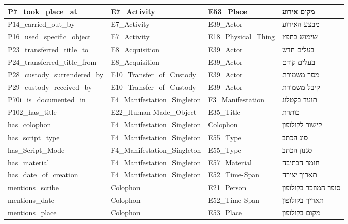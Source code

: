 \documentclass[12pt,a4paper]{article}
\begin{document}
{\begin{longtable}{|p{4cm}|p{3.5cm}|p{3.5cm}|p{4.5cm}|}
\hline
\textenglish{P7\_took\_place\_at} & \textenglish{E7\_Activity} & \textenglish{E53\_Place} & מקום אירוע \\
\hline
\textenglish{P14\_carried\_out\_by} & \textenglish{E7\_Activity} & \textenglish{E39\_Actor} & מבצע האירוע \\
\hline
\textenglish{P16\_used\_specific\_object} & \textenglish{E7\_Activity} & \textenglish{E18\_Physical\_Thing} & שימוש בחפץ \\
\hline
\textenglish{P23\_transferred\_title\_to} & \textenglish{E8\_Acquisition} & \textenglish{E39\_Actor} & בעלים חדש \\
\hline
\textenglish{P24\_transferred\_title\_from} & \textenglish{E8\_Acquisition} & \textenglish{E39\_Actor} & בעלים קודם \\
\hline
\textenglish{P28\_custody\_surrendered\_by} & \textenglish{E10\_Transfer\_of\_Custody} & \textenglish{E39\_Actor} & מסר משמורת \\
\hline
\textenglish{P29\_custody\_received\_by} & \textenglish{E10\_Transfer\_of\_Custody} & \textenglish{E39\_Actor} & קיבל משמורת \\
\hline
\textenglish{P70i\_is\_documented\_in} & \textenglish{F4\_Manifestation\_Singleton} & \textenglish{F3\_Manifestation} & תועד בקטלוג \\
\hline
\textenglish{P102\_has\_title} & \textenglish{E22\_Human-Made\_Object} & \textenglish{E35\_Title} & כותרת \\
\hline
\textenglish{has\_colophon} & \textenglish{F4\_Manifestation\_Singleton} & \textenglish{Colophon} & קישור לקולופון \\
\hline
\textenglish{has\_script\_type} & \textenglish{F4\_Manifestation\_Singleton} & \textenglish{E55\_Type} & סוג הכתב \\
\hline
\textenglish{has\_Script\_Mode} & \textenglish{F4\_Manifestation\_Singleton} & \textenglish{E55\_Type} & סגנון הכתב \\
\hline
\textenglish{has\_material} & \textenglish{F4\_Manifestation\_Singleton} & \textenglish{E57\_Material} & חומר הכתיבה \\
\hline
\textenglish{has\_date\_of\_creation} & \textenglish{F4\_Manifestation\_Singleton} & \textenglish{E52\_Time-Span} & תאריך יצירה \\
\hline
\textenglish{mentions\_scribe} & \textenglish{Colophon} & \textenglish{E21\_Person} & סופר המוזכר בקולופון \\
\hline
\textenglish{mentions\_date} & \textenglish{Colophon} & \textenglish{E52\_Time-Span} & תאריך בקולופון \\
\hline
\textenglish{mentions\_place} & \textenglish{Colophon} & \textenglish{E53\_Place} & מקום בקולופון \\
\hline
\end{longtable}
}
\end{document}
